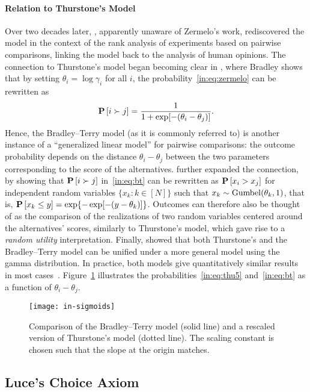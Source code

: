\paragraph{Relation to Thurstone's Model}
Over two decades later, \citet{bradley1952rank}, apparently unaware of Zermelo's work, rediscovered the model in the context of the rank analysis of experiments based on pairwise comparisons, linking the model back to the analysis of human opinions.
The connection to Thurstone's model began becoming clear in \citet{bradley1953some}, where Bradley shows that by setting $\theta_i = \log \gamma_i$ for all $i$, the probability~\eqref{in:eq:zermelo} can be rewritten as
\begin{align}
\label{in:eq:bt}
\mathbf{P}\left[ i \succ j \right] = \frac{1}{1 + \exp[-(\theta_i - \theta_j)]}.
\end{align}
Hence, the Bradley--Terry model (as it is commonly referred to) is another instance of a ``generalized linear model'' for pairwise comparisons: the outcome probability depends on the distance $\theta_i - \theta_j$ between the two parameters corresponding to the score of the alternatives.
\citet{yellot1977relationship} further expanded the connection, by showing that $\mathbf{P}\left[ i \succ j \right]$ in~\eqref{in:eq:bt} can be rewritten as $\mathbf{P}\left[ x_i > x_j \right]$ for independent random variables $\{x_k : k \in [N]\}$ such that $x_k \sim \mathrm{Gumbel}( \theta_k, 1 )$, that is, $\mathbf{P}\left[ x_k \le y \right] = \exp\{-\exp[-(y - \theta_k)]\}$.
Outcomes can therefore also be thought of as the comparison of the realizations of two random variables centered around the alternatives' scores, similarly to Thurstone's model, which gave rise to a \emph{random utility} interpretation.
Finally, \citet{stern1992all} showed that both Thurstone's and the Bradley--Terry model can be unified under a more general model using the gamma distribution.
In practice, both models give quantitatively similar results in most cases~\citep{tsukida2011how}.
Figure~\ref{in:fig:sigmoids} illustrates the probabilities~\eqref{in:eq:thu5} and~\eqref{in:eq:bt} as a function of $\theta_i - \theta_j$.

\begin{figure}
\centering
\texttt{[image: in-sigmoids]}
\caption{
Comparison of the Bradley--Terry model (solid line) and a rescaled version of Thurstone's model (dotted line).
The scaling constant is chosen such that the slope at the origin matches.
}
\label{in:fig:sigmoids}
\end{figure}


\subsection{Luce's Choice Axiom}
\label{in:sec:choice}

